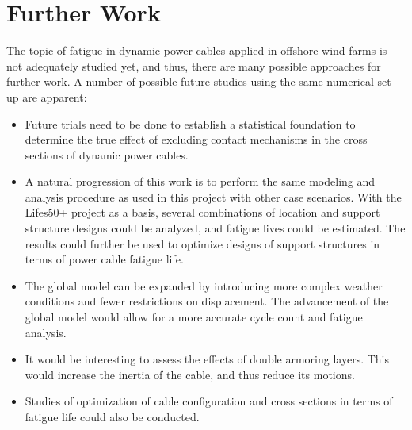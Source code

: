 \section{Further Work}
The topic of fatigue in dynamic power cables applied in offshore wind farms is not adequately studied yet, and thus, there are many possible approaches for further work. A number of possible future studies using the same numerical set up are apparent: 
\begin{itemize}
    \item Future trials need to be done to establish a statistical foundation to determine the true effect of excluding contact mechanisms in the cross sections of dynamic power cables.  
    \item A natural progression of this work is to perform the same modeling and analysis procedure as used in this project with other case scenarios. With the Lifes50+ project as a basis, several combinations of location and support structure designs could be analyzed, and fatigue lives could be estimated. The results could further be used to optimize designs of support structures in terms of power cable fatigue life.  
    \item The global model can be expanded by introducing more complex weather conditions and fewer restrictions on displacement. The advancement of the global model would allow for a more accurate cycle count and fatigue analysis.  
    \item It would be interesting to assess the effects of double armoring layers. This would increase the inertia of the cable, and thus reduce its motions.
    \item Studies of optimization of cable configuration and cross sections in terms of fatigue life could also be conducted. 
\end{itemize}

  